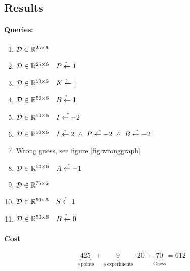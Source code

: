 \documentclass[12pt,fleqn,]{article}
\begin{document}
\begin{multicols}{2}
\section{Results}

\paragraph{ Queries:}

\begin{enumerate}
	\item \(\mathcal D \in \mathbb R^{25\times 6}\)
	\item \(\mathcal D \in \mathbb R^{25\times 6}\quad \mathring{P\leftarrow1}\) 
	\item \(\mathcal D \in \mathbb R^{50\times 6}\quad \mathring{K\leftarrow1}\) 
	\item \(\mathcal D \in \mathbb R^{50\times 6}\quad \mathring{B\leftarrow1}\) 
	\item \(\mathcal D \in \mathbb R^{50\times 6}\quad \mathring{I\leftarrow-2}\) 
	\item \(\mathcal D \in \RR^{50\times 6}\quad \mathring{I\leftarrow2}\ \wedge\ \mathring{P\leftarrow-2}\ \wedge\ \mathring{B\leftarrow-2}\) 
	\item Wrong guess, see figure \ref{fig:wronggraph}
	\item \(\mathcal D \in \mathbb R^{50\times 6}\quad  \mathring{A\leftarrow-1}\) 
	\item \(\mathcal D \in \mathbb R^{75\times 6}\) 
	\item \(\mathcal D \in \mathbb R^{50\times 6}\quad  \mathring{S\leftarrow1}\)
	\item \(\mathcal D \in \mathbb R^{50\times 6}\quad  \mathring{B\leftarrow0}\) 
\end{enumerate}

\paragraph{Cost}
\[
\underbrace{425}_{\text{\# points}} + \underbrace {9}_ {\text{\# experiments}} \cdot 20 +\underbrace{70}_{\text{Guess}}=612
\]


\end{multicols}
\end{document}

